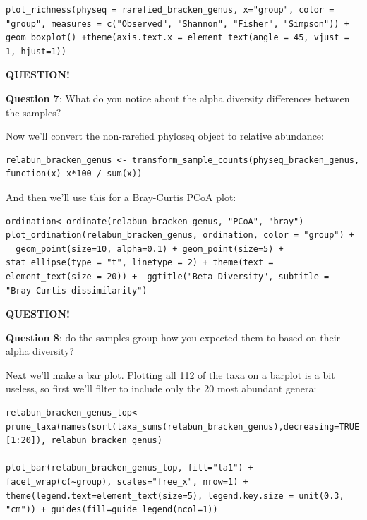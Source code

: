 \documentclass[
]{book}
\newenvironment{bluebox}{
  \definecolor{shadecolor}{RGB}{172, 210, 237}
  \color{white}
  \begin{shaded}}
 {\end{shaded}}
\begin{document}
\begin{verbatim}
plot_richness(physeq = rarefied_bracken_genus, x="group", color = "group", measures = c("Observed", "Shannon", "Fisher", "Simpson")) + geom_boxplot() +theme(axis.text.x = element_text(angle = 45, vjust = 1, hjust=1))
\end{verbatim}

\begin{bluebox}

\begin{center}
\textbf{QUESTION!}

\end{center}

\textbf{Question 7}: What do you notice about the alpha diversity differences between the samples?

\end{bluebox}

Now we'll convert the non-rarefied phyloseq object to relative abundance:

\begin{verbatim}
relabun_bracken_genus <- transform_sample_counts(physeq_bracken_genus, function(x) x*100 / sum(x))
\end{verbatim}

And then we'll use this for a Bray-Curtis PCoA plot:

\begin{verbatim}
ordination<-ordinate(relabun_bracken_genus, "PCoA", "bray")
plot_ordination(relabun_bracken_genus, ordination, color = "group") +
  geom_point(size=10, alpha=0.1) + geom_point(size=5) + stat_ellipse(type = "t", linetype = 2) + theme(text = element_text(size = 20)) +  ggtitle("Beta Diversity", subtitle = "Bray-Curtis dissimilarity")
\end{verbatim}

\begin{bluebox}

\begin{center}
\textbf{QUESTION!}

\end{center}

\textbf{Question 8}: do the samples group how you expected them to based on their alpha diversity?

\end{bluebox}

Next we'll make a bar plot. Plotting all 112 of the taxa on a barplot is a bit useless, so first we'll filter to include only the 20 most abundant genera:

\begin{verbatim}
relabun_bracken_genus_top<-prune_taxa(names(sort(taxa_sums(relabun_bracken_genus),decreasing=TRUE)[1:20]), relabun_bracken_genus)

plot_bar(relabun_bracken_genus_top, fill="ta1") + facet_wrap(c(~group), scales="free_x", nrow=1) + theme(legend.text=element_text(size=5), legend.key.size = unit(0.3, "cm")) + guides(fill=guide_legend(ncol=1))
\end{verbatim}
\end{document}
